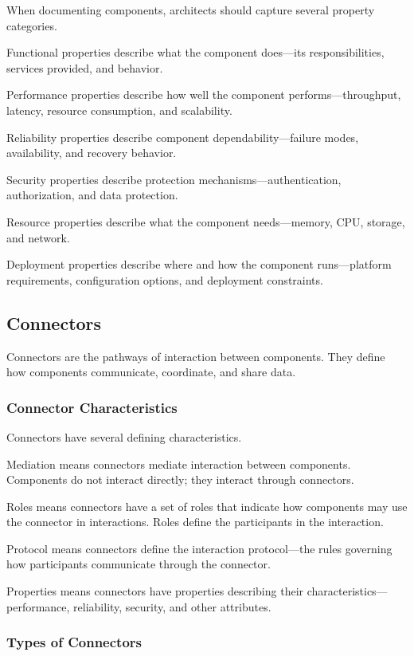 \documentclass[11pt]{article}
\begin{document}
When documenting components, architects should capture several property categories.

Functional properties describe what the component does---its responsibilities, services provided, and behavior.

Performance properties describe how well the component performs---throughput, latency, resource consumption, and scalability.

Reliability properties describe component dependability---failure modes, availability, and recovery behavior.

Security properties describe protection mechanisms---authentication, authorization, and data protection.

Resource properties describe what the component needs---memory, CPU, storage, and network.

Deployment properties describe where and how the component runs---platform requirements, configuration options, and deployment constraints.

\subsection{Connectors}

Connectors are the pathways of interaction between components. They define how components communicate, coordinate, and share data.

\subsubsection{Connector Characteristics}

Connectors have several defining characteristics.

Mediation means connectors mediate interaction between components. Components do not interact directly; they interact through connectors.

Roles means connectors have a set of roles that indicate how components may use the connector in interactions. Roles define the participants in the interaction.

Protocol means connectors define the interaction protocol---the rules governing how participants communicate through the connector.

Properties means connectors have properties describing their characteristics---performance, reliability, security, and other attributes.

\subsubsection{Types of Connectors}
\end{document}
